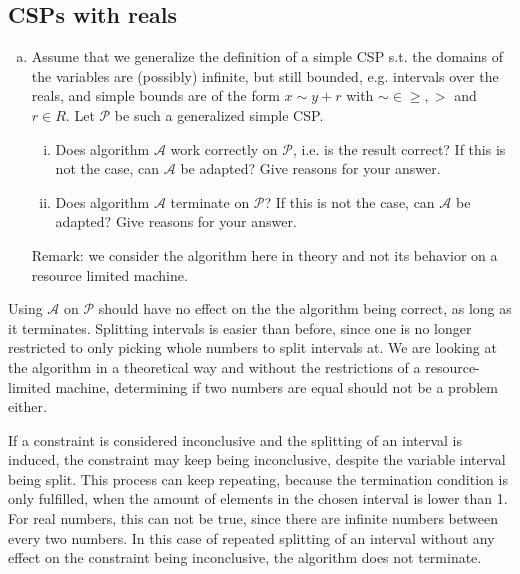 \subsection{CSPs with reals}

\begin{enumerate}[(d)]
    \item Assume that we generalize the definition of a simple CSP s.t. the domains of the variables are (possibly) infinite, but still bounded, e.g. intervals over the reals, and simple bounds are of the form $x \sim y + r$ with $\sim \in {\geq , >}$ and $r \in R$. Let $\mathcal{P}$ be such a generalized simple CSP.
    \begin{enumerate}[i.]
        \item Does algorithm $\mathcal{A}$ work correctly on $\mathcal{P}$, i.e. is the result correct? If this is not the case, can $\mathcal{A}$ be adapted? Give reasons for your answer.
        \item Does algorithm $\mathcal{A}$ terminate on $\mathcal{P}$? If this is not the case, can $\mathcal{A}$ be adapted? Give reasons for your answer.
    \end{enumerate}
    Remark: we consider the algorithm here in theory and not its behavior on a resource limited machine.
\end{enumerate}

Using $\mathcal{A}$ on $\mathcal{P}$ should have no effect on the the algorithm being correct, as long as it terminates. Splitting intervals is easier than before, since one is no longer restricted to only picking whole numbers to split intervals at. We are looking at the algorithm in a theoretical way and without the restrictions of a resource-limited machine, determining if two numbers are equal should not be a problem either. 

If a constraint is considered inconclusive and the splitting of an interval is induced, the constraint may keep being inconclusive, despite the variable interval being split. This process can keep repeating, because the termination condition is only fulfilled, when the amount of elements in the chosen interval is lower than 1. For real numbers, this can not be true, since there are infinite numbers between every two numbers. In this case of repeated splitting of an interval without any effect on the constraint being inconclusive, the algorithm does not terminate.


